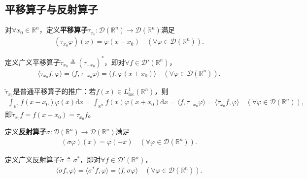 \documentclass[../../main.tex]{subfiles}%
\begin{document}
\subsection{平移算子与反射算子}
\begin{definition}
对$\forall x_0\in\mathbb{R}^n$，定义\textbf{平移算子}$\tau_{x_0}:\mathscr{D}(\mathbb{R}^n)\to\mathscr{D}(\mathbb{R}^n)$满足
\begin{align*}
(\tau_{x_0}\varphi)(x)=\varphi(x-x_0)\quad(\forall\varphi\in\mathscr{D}(\mathbb{R}^n)).
\end{align*}
\end{definition}

\begin{definition}
定义广义平移算子$\widetilde{\tau}_{x_0}\triangleq(\tau_{-x_0})^*$，即对$\forall f\in\mathscr{D}'(\mathbb{R}^n)$，
\begin{align*}
\langle\widetilde{\tau}_{x_0}f,\varphi\rangle=\langle f,\tau_{-x_0}\varphi\rangle=\langle f,\varphi(x+x_0)\rangle\quad(\forall\varphi\in\mathscr{D}(\mathbb{R}^n)).
\end{align*}
\end{definition}

\begin{remark}
$\widetilde{\tau}_{x_0}$是普通平移算子的推广：若$f(x)\in L^1_{\mathrm{loc}}(\mathbb{R}^n)$，则
\begin{align*}
\int_{\mathbb{R}^n}f(x-x_0)\varphi(x)\mathrm{d}x=\int_{\mathbb{R}^n}f(x)\varphi(x+x_0)\mathrm{d}x=\langle f,\tau_{-x_0}\varphi\rangle=\langle\widetilde{\tau}_{x_0}f,\varphi\rangle\quad(\forall\varphi\in\mathscr{D}(\mathbb{R}^n)),
\end{align*}
即$\widetilde{\tau}_{x_0}f=f(x-x_0)=\tau_{x_0}f$。
\end{remark}

\begin{definition}
定义\textbf{反射算子}$\sigma:\mathscr{D}(\mathbb{R}^n)\to\mathscr{D}(\mathbb{R}^n)$满足
\begin{align*}
(\sigma\varphi)(x)=\varphi(-x)\quad(\forall\varphi\in\mathscr{D}(\mathbb{R}^n)).
\end{align*}
\end{definition}

\begin{definition}
定义广义反射算子$\widetilde{\sigma}\triangleq\sigma^*$，即对$\forall f\in\mathscr{D}'(\mathbb{R}^n)$，
\begin{align*}
\langle\widetilde{\sigma}f,\varphi\rangle=\langle\sigma^*f,\varphi\rangle=\langle f,\sigma\varphi\rangle\quad(\forall\varphi\in\mathscr{D}(\mathbb{R}^n)).
\end{align*}
\end{definition}
\end{document}
